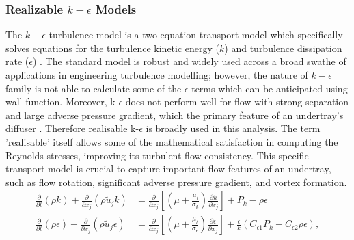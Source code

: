 \subsubsection{Realizable $k-\epsilon$ Models}
The $k-\epsilon$ turbulence model is a two-equation transport model which specifically solves equations for the turbulence kinetic energy ($k$) and turbulence dissipation rate ($\epsilon$) \cite{Andersson2011Turbulent-flowModelling} \cite{Mansour1989Near-wallModeling} \cite{Ansys2006ModelingFlows}. The standard model is robust and widely used across a broad swathe of applications in engineering turbulence modelling; however, the nature of $k-\epsilon$ family is not able to calculate some of the $\epsilon$ terms which can be anticipated using wall function. Moreover, k-$\epsilon$ does not perform well for flow with strong separation and large adverse pressure gradient, which the primary feature of an undertray's diffuser \cite{Ansys2006ModelingFlows}.  Therefore realisable k-$\epsilon$ is broadly used in this analysis. The term 'realisable' itself allows some of the mathematical satisfaction in computing the Reynolds stresses, improving its turbulent flow consistency. This specific transport model is crucial to capture important flow features of an undertray, such as flow rotation, significant adverse pressure gradient, and vortex formation.
\begin{align}
\frac{\partial}{\partial t}(\bar{\rho} k)+\frac{\partial}{\partial x_j}(\bar{\rho} \tilde{u}_j k) & = \frac{\partial}{\partial x_j} \left[ \left(\mu + \frac{\mu_t}{\sigma_k}\right) \frac{\partial k}{\partial x_j} \right] +P_k-\bar{\rho}\epsilon \\ 
\frac{\partial }{\partial t}(\bar{\rho} \epsilon)+\frac{\partial}{\partial x_j}(\bar{\rho} \tilde{u}_j \epsilon) & = \frac{\partial}{\partial x_j} \left[ \left(\mu + \frac{\mu_t}{\sigma_{\epsilon}}\right) \frac{\partial \epsilon}{\partial x_j} \right] + \frac{\epsilon}{k}(C_{\epsilon 1}P_k-C_{\epsilon 2}\bar{\rho} \epsilon),
\end{align} 

